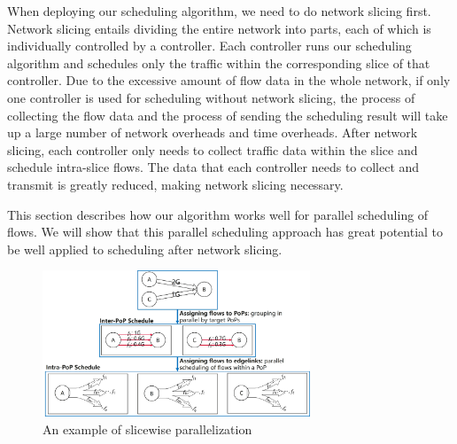 
When deploying our scheduling algorithm, we need to do network slicing first. Network slicing entails dividing the entire network into parts, each of which is individually controlled by a controller. Each controller runs our scheduling algorithm and schedules only the traffic within the corresponding slice of that controller. Due to the excessive amount of flow data in the whole network, if only one controller is used for scheduling without network slicing, the process of collecting the flow data and the process of sending the scheduling result will take up a large number of network overheads and time overheads. After network slicing, each controller only needs to collect traffic data within the slice and schedule intra-slice flows. The data that each controller needs to collect and transmit is greatly reduced, making network slicing necessary.

This section describes how our algorithm works well for parallel scheduling of flows. We will show that this parallel scheduling approach has great potential to be well applied to scheduling after network slicing. 


\begin{figure}
	\centering
	\includegraphics[width = 8cm]{figs/implement/network slicing.jpg}
	\caption{\small An example of slicewise parallelization}
	\label{fig:network slicing}
\end{figure}

